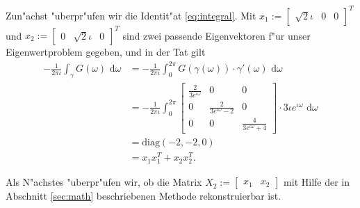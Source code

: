 Zun"achst "uberpr"ufen wir
die Identit"at \eqref{eq:integral}. Mit $x_1 := \begin{bmatrix} \sqrt2 \iota & 0 & 0
\end{bmatrix}^T$
und $x_2 := \begin{bmatrix} 0 & \sqrt2 \iota &0\end{bmatrix}^T$ sind zwei passende
Eigenvektoren f"ur unser Eigenwertproblem gegeben, und in der Tat gilt
\begin{align*}
-\frac{1}{2\pi\iota} \int_\gamma G(\omega) \text{ d}\omega &=
-\frac{1}{2\pi\iota}\int_0^{2\pi} G(\gamma(\omega))\cdot \gamma'(\omega)
\text{ d}\omega \\
&= -\frac{1}{2\pi\iota}\int_0^{2\pi} \begin{bmatrix} \frac{2}{3e^{\iota\omega}}&0&0\\
0 & \frac{2}{3e^{\iota\omega}-2}&0\\
0&0&\frac{4}{3e^{\iota\omega}+4}
 \end{bmatrix}\cdot 3\iota e^{\iota\omega}
\text{ d}\omega \\
&= \text{diag}(-2,-2,0) \\
&= x_1 x_1^{T} + x_2 x_2^T.
\end{align*}

Als N"achstes "uberpr"ufen wir, ob die Matrix $X_2 := \begin{bmatrix} x_1 & x_2\end{bmatrix}$ mit Hilfe der in Abschnitt \ref{sec:math} beschriebenen Methode rekonstruierbar ist.\\

